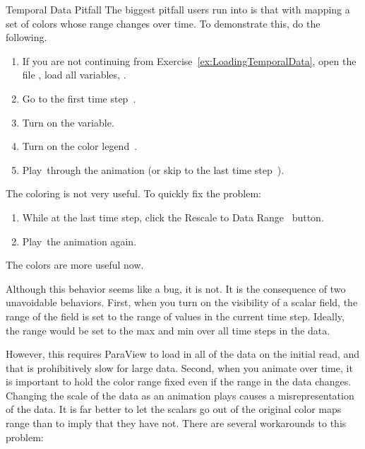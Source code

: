 \begin{exercise}{Temporal Data Pitfall}
  \label{ex:TemporalDataPitfall}%
  The biggest pitfall users run into is that with mapping a set of colors
  whose range changes over time.  To demonstrate this, do the following.

  \begin{enumerate}
  \item If you are not continuing from
    Exercise~\ref{ex:LoadingTemporalData}, open the file ,
    load all variables, \apply.
  \item Go to the first time step~\vcrFirst.
  \item Turn on the  variable.
  \item Turn on the color legend~.
  \item Play~\vcrPlay through the animation (or skip to the last time
    step~\vcrLast).
    \savecounter
  \end{enumerate}

  The coloring is not very useful.  To quickly fix the problem:

  \begin{enumerate}
    \restorecounter
  \item While at the last time step, click the Rescale to Data
    Range~ button.
  \item Play~\vcrPlay the animation again.
  \end{enumerate}

  The colors are more useful now.
\end{exercise}

Although this behavior seems like a bug, it is not.  It is the consequence
of two unavoidable behaviors.  First, when you turn on the visibility of a
scalar field, the range of the field is set to the range of values in the
current time step.  Ideally, the range would be set to the max and min over
all time steps in the data.

However, this requires ParaView to load
in all of the data on the initial read, and that is prohibitively
slow for large data.  Second, when you animate over time, it is important
to hold the color range fixed even if the range in the data changes.
Changing the scale of the data as an animation plays causes a
misrepresentation of the data.  It is far better to let the scalars go out
of the original color maps range than to imply that they have not.  There
are several workarounds to this problem:

